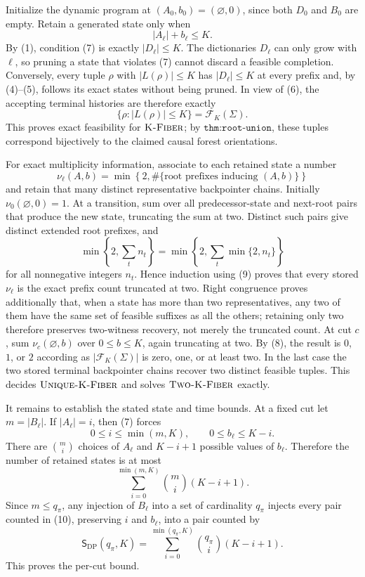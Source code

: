 Initialize the dynamic program at \((A_0,b_0)=(\varnothing,0)\), since both \(D_0\) and \(B_0\) are empty.  Retain a generated state only when
\[
|A_\ell|+b_\ell\leq K. \tag{7}
\]
By (1), condition (7) is exactly \(|D_\ell|\leq K\).  The dictionaries \(D_\ell\) can only grow with \(\ell\), so pruning a state that violates (7) cannot discard a feasible completion.  Conversely, every tuple \(\rho\) with \(|L(\rho)|\leq K\) has \(|D_\ell|\leq K\) at every prefix and, by (4)--(5), follows its exact states without being pruned.  In view of (6), the accepting terminal histories are therefore exactly
\[
\{\rho:|L(\rho)|\leq K\}=\mathcal F_K(\Sigma). \tag{8}
\]
This proves exact feasibility for \(\textsc{K-Fiber}\); by \(\texttt{thm:root-union}\), these tuples correspond bijectively to the claimed causal forest orientations.

For exact multiplicity information, associate to each retained state a number
\[
\nu_\ell(A,b)=
\min\!\left\{2,\#\{\text{root prefixes inducing }(A,b)\}\right\}
\]
and retain that many distinct representative backpointer chains.  Initially \(\nu_0(\varnothing,0)=1\).  At a transition, sum over all predecessor-state and next-root pairs that produce the new state, truncating the sum at two.  Distinct such pairs give distinct extended root prefixes, and
\[
\min\!\left\{2,\sum_t n_t\right\}
=
\min\!\left\{2,\sum_t\min\{2,n_t\}\right\} \tag{9}
\]
for all nonnegative integers \(n_t\).  Hence induction using (9) proves that every stored \(\nu_\ell\) is the exact prefix count truncated at two.  Right congruence proves additionally that, when a state has more than two representatives, any two of them have the same set of feasible suffixes as all the others; retaining only two therefore preserves two-witness recovery, not merely the truncated count.  At cut \(c\), sum \(\nu_c(\varnothing,b)\) over \(0\leq b\leq K\), again truncating at two.  By (8), the result is \(0\), \(1\), or \(2\) according as \(|\mathcal F_K(\Sigma)|\) is zero, one, or at least two.  In the last case the two stored terminal backpointer chains recover two distinct feasible tuples.  This decides \(\textsc{Unique-K-Fiber}\) and solves \(\textsc{Two-K-Fiber}\) exactly.

It remains to establish the stated state and time bounds.  At a fixed cut let \(m=|B_\ell|\).  If \(|A_\ell|=i\), then (7) forces
\[
0\leq i\leq\min(m,K),
\qquad
0\leq b_\ell\leq K-i.
\]
There are \(\binom mi\) choices of \(A_\ell\) and \(K-i+1\) possible values of \(b_\ell\).  Therefore the number of retained states is at most
\[
\sum_{i=0}^{\min(m,K)}\binom mi(K-i+1). \tag{10}
\]
Since \(m\leq q_\pi\), any injection of \(B_\ell\) into a set of cardinality \(q_\pi\) injects every pair counted in (10), preserving \(i\) and \(b_\ell\), into a pair counted by
\[
\mathsf S_{\mathrm{DP}}(q_\pi,K)
=\sum_{i=0}^{\min(q_\pi,K)}\binom{q_\pi}{i}(K-i+1). \tag{11}
\]
This proves the per-cut bound.

